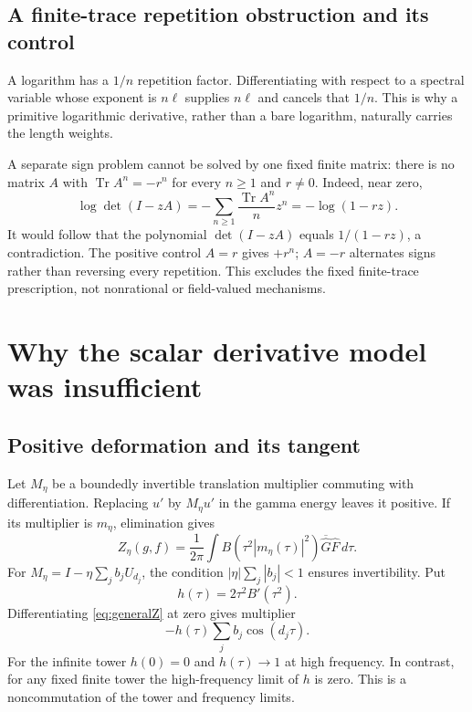 \documentclass[11pt]{article}
\numberwithin{equation}{section}
\theoremstyle{definition}
\theoremstyle{remark}
\begin{document}
\subsection{A finite-trace repetition obstruction and its control}
A logarithm has a $1/n$ repetition factor. Differentiating with respect to a spectral variable whose exponent is $n\ell$ supplies $n\ell$ and cancels that $1/n$. This is why a primitive logarithmic derivative, rather than a bare logarithm, naturally carries the length weights.

A separate sign problem cannot be solved by one fixed finite matrix: there is no matrix $A$ with $\operatorname{Tr}A^n=-r^n$ for every $n\ge1$ and $r\ne0$. Indeed, near zero,
\begin{equation}
 \log\det(I-zA)=-\sum_{n\ge1}\frac{\operatorname{Tr}A^n}{n}z^n
 =-\log(1-rz).
\end{equation}
It would follow that the polynomial $\det(I-zA)$ equals $1/(1-rz)$, a contradiction. The positive control $A=r$ gives $+r^n$; $A=-r$ alternates signs rather than reversing every repetition. This excludes the fixed finite-trace prescription, not nonrational or field-valued mechanisms.

\section{Why the scalar derivative model was insufficient}
\label{sec:scalar}
\subsection{Positive deformation and its tangent}
Let $M_\eta$ be a boundedly invertible translation multiplier commuting with differentiation. Replacing $u'$ by $M_\eta u'$ in the gamma energy leaves it positive. If its multiplier is $m_\eta$, elimination gives
\begin{equation}
 Z_\eta(g,f)=\frac1{2\pi}\int B(\tau^2|m_\eta(\tau)|^2)
 \overline{\widehat G}\widehat F\,d\tau.
 \label{eq:generalZ}
\end{equation}
For $M_\eta=I-\eta\sum_j b_jU_{d_j}$, the condition $|\eta|\sum_j|b_j|<1$ ensures invertibility. Put
\begin{equation}
 h(\tau)=2\tau^2B'(\tau^2).
\end{equation}
Differentiating \eqref{eq:generalZ} at zero gives multiplier
\begin{equation}
 -h(\tau)\sum_j b_j\cos(d_j\tau).
 \label{eq:tangent}
\end{equation}
For the infinite tower $h(0)=0$ and $h(\tau)\to1$ at high frequency. In contrast, for any fixed finite tower the high-frequency limit of $h$ is zero. This is a noncommutation of the tower and frequency limits.
\end{document}
